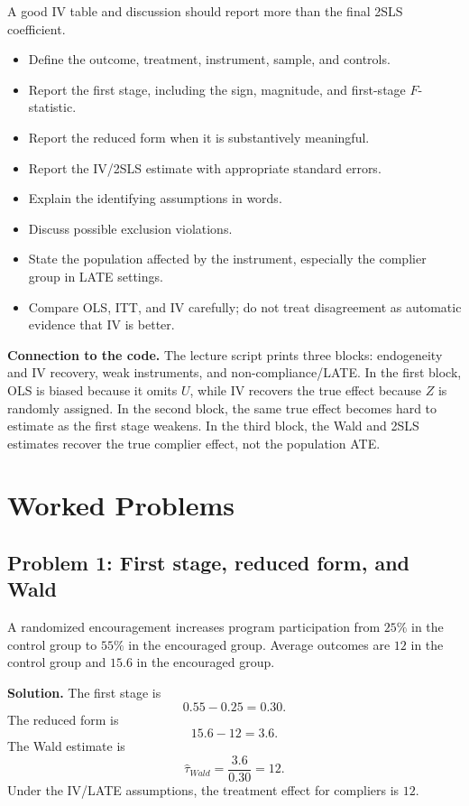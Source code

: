 A good IV table and discussion should report more than the final 2SLS
coefficient.
\begin{itemize}
  \item Define the outcome, treatment, instrument, sample, and controls.
  \item Report the first stage, including the sign, magnitude, and
        first-stage $F$-statistic.
  \item Report the reduced form when it is substantively meaningful.
  \item Report the IV/2SLS estimate with appropriate standard errors.
  \item Explain the identifying assumptions in words.
  \item Discuss possible exclusion violations.
  \item State the population affected by the instrument, especially the
        complier group in LATE settings.
  \item Compare OLS, ITT, and IV carefully; do not treat disagreement as
        automatic evidence that IV is better.
\end{itemize}

\begin{boxD}
\textbf{Connection to the code.} The lecture script prints three blocks:
endogeneity and IV recovery, weak instruments, and non-compliance/LATE. In the
first block, OLS is biased because it omits $U$, while IV recovers the true
effect because $Z$ is randomly assigned. In the second block, the same true
effect becomes hard to estimate as the first stage weakens. In the third block,
the Wald and 2SLS estimates recover the true complier effect, not the population
ATE.
\end{boxD}

\section{Worked Problems}

\subsection{Problem 1: First stage, reduced form, and Wald}

A randomized encouragement increases program participation from $25\%$ in the
control group to $55\%$ in the encouraged group. Average outcomes are $12$ in
the control group and $15.6$ in the encouraged group.

\textbf{Solution.} The first stage is
\[
    0.55-0.25=0.30.
\]
The reduced form is
\[
    15.6-12=3.6.
\]
The Wald estimate is
\[
    \hat{\tau}_{Wald} = \frac{3.6}{0.30}=12.
\]
Under the IV/LATE assumptions, the treatment effect for compliers is $12$.

